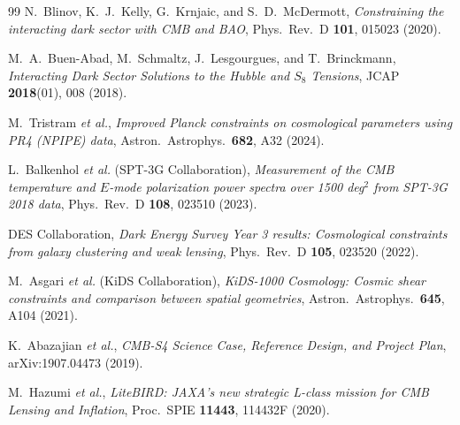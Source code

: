 \documentclass[11pt,a4paper]{article}
\theoremstyle{definition}
\begin{document}
\begin{thebibliography}{99}
N.~Blinov, K.~J.~Kelly, G.~Krnjaic, and S.~D.~McDermott,
\textit{Constraining the interacting dark sector with CMB and BAO},
Phys.\ Rev.\ D \textbf{101}, 015023 (2020).

M.~A.~Buen-Abad, M.~Schmaltz, J.~Lesgourgues, and T.~Brinckmann,
\textit{Interacting Dark Sector Solutions to the Hubble and $S_8$ Tensions},
JCAP \textbf{2018}(01), 008 (2018).

M.~Tristram \textit{et al.},
\textit{Improved Planck constraints on cosmological parameters using PR4 (NPIPE) data},
Astron.\ Astrophys.\ \textbf{682}, A32 (2024).

L.~Balkenhol \textit{et al.} (SPT-3G Collaboration),
\textit{Measurement of the CMB temperature and $E$-mode polarization power spectra over 1500 deg$^2$ from SPT-3G 2018 data},
Phys.\ Rev.\ D \textbf{108}, 023510 (2023).

DES Collaboration,
\textit{Dark Energy Survey Year 3 results: Cosmological constraints from galaxy clustering and weak lensing},
Phys.\ Rev.\ D \textbf{105}, 023520 (2022).

M.~Asgari \textit{et al.} (KiDS Collaboration),
\textit{KiDS-1000 Cosmology: Cosmic shear constraints and comparison between spatial geometries},
Astron.\ Astrophys.\ \textbf{645}, A104 (2021).

K.~Abazajian \textit{et al.},
\textit{CMB-S4 Science Case, Reference Design, and Project Plan},
arXiv:1907.04473 (2019).

M.~Hazumi \textit{et al.},
\textit{LiteBIRD: JAXA's new strategic L-class mission for CMB Lensing and Inflation},
Proc.\ SPIE \textbf{11443}, 114432F (2020).

\end{thebibliography}
\end{document}
